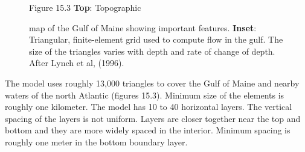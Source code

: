 \begin{figure}[t!]
\footnotesize
Figure 15.3 \textbf{Top}: Topographic \rule{0mm}{3ex}map of the Gulf
of Maine showing important features. \textbf{Inset}: Triangular,
finite-element grid used to compute flow in the gulf. The size of the
triangles varies with depth and rate of change of depth. After Lynch
et al, (1996).
\vspace{-3ex}
\label{fig:GulfofMaine}
\end{figure}

The model uses roughly 13,000 triangles to cover the Gulf of Maine and
nearby waters of the north Atlantic (figures 15.3). Minimum size of
the elements is roughly one kilometer. The model has 10 to 40
horizontal layers. The vertical spacing of the layers is not uniform.
Layers are closer together near the top and bottom and they are more
widely spaced in the interior. Minimum spacing is roughly one meter in
the bottom boundary layer.

